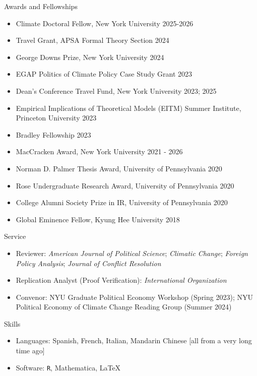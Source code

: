 \documentclass{resume} %
\begin{document}
\begin{rSection}{Awards and Fellowships}
\begin{itemize}
\item Climate Doctoral Fellow, New York University \hfill 2025-2026
\item Travel Grant, APSA Formal Theory Section \hfill 2024
\item George Downs Prize, New York University \hfill 2024
\item EGAP Politics of Climate Policy Case Study Grant \hfill 2023
\item Dean's Conference Travel Fund, New York University \hfill 2023; 2025
\item Empirical Implications of Theoretical Models (EITM) Summer Institute, Princeton University \hfill 2023
\item Bradley Fellowship \hfill 2023
\item MacCracken Award, New York University \hfill 2021 - 2026
\item Norman D. Palmer Thesis Award, University of Pennsylvania \hfill 2020
\item Rose Undergraduate Research Award, University of Pennsylvania \hfill 2020
\item College Alumni Society Prize in IR, University of Pennsylvania \hfill 2020
\item Global Eminence Fellow, Kyung Hee University \hfill 2018
\end{itemize}
\end{rSection}

\begin{rSection}{Service}
\begin{itemize}
\item Reviewer:  \textit{American Journal of Political Science};  \textit{Climatic Change}; \textit{Foreign Policy Analysis}; \textit{Journal of Conflict Resolution}

\item Replication Analyst (Proof Verification):  \textit{International Organization} 
\item Convenor: NYU Graduate Political Economy Workshop (Spring 2023); NYU Political Economy of Climate Change Reading Group (Summer 2024)
\end{itemize}
 \end{rSection}

\begin{rSection}{Skills}
\begin{itemize}
\item Languages: Spanish, French, Italian, Mandarin Chinese [all from a very long time ago]
\item Software: \texttt{R}, Mathematica, \LaTeX
\end{itemize}
\end{rSection}
\end{document}
